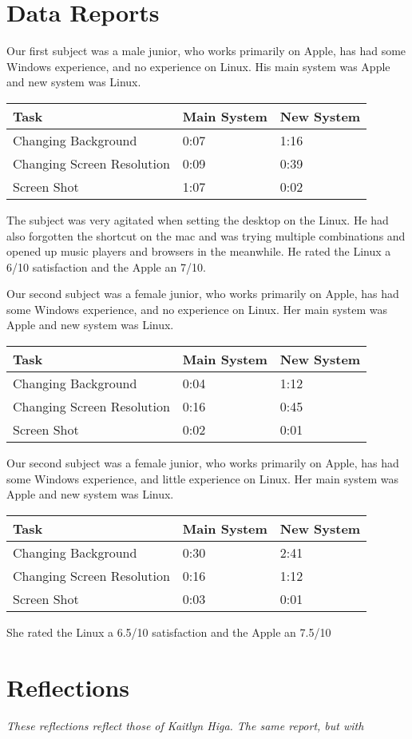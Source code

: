 \documentclass[12pt, onesided, letterpaper]{report}
\begin{document}
\section*{Data Reports}
Our first subject was a male junior, who works primarily on Apple, has had some Windows experience, and no experience on Linux. His main system was Apple and new system was Linux.
\begin{center}
    \begin{tabular}{ | l | l | l |}
    \hline
    Task &Main System & New System  \\ \hline
    Changing Background & 0:07 & 1:16  \\ \hline
    Changing Screen Resolution & 0:09 & 0:39  \\ \hline
    Screen Shot & 1:07 & 0:02 \\
    \hline
    \end{tabular}
\end{center}
The subject was very agitated when setting the desktop on the Linux.  He had also forgotten the shortcut on the mac and was trying multiple combinations and opened up music players and browsers in the meanwhile. 
He rated the Linux a 6/10 satisfaction and the Apple an 7/10.

Our second subject was a female junior, who works primarily on Apple, has had some Windows experience, and no experience on Linux.  Her main system was Apple and new system was Linux.
\begin{center}
    \begin{tabular}{ | l | l | l |}
    \hline
    Task &Main System & New System  \\ \hline
    Changing Background & 0:04 & 1:12  \\ \hline
    Changing Screen Resolution & 0:16 & 0:45  \\ \hline
    Screen Shot & 0:02 & 0:01 \\
    \hline
    \end{tabular}
\end{center}

Our second subject was a female junior, who works primarily on Apple, has had some Windows experience, and little experience on Linux. Her main system was Apple and new system was Linux.
\begin{center}
    \begin{tabular}{ | l | l | l |}
    \hline
    Task &Main System & New System  \\ \hline
    Changing Background & 0:30 & 2:41  \\ \hline
    Changing Screen Resolution & 0:16 & 1:12  \\ \hline
    Screen Shot & 0:03 & 0:01 \\
    \hline
    \end{tabular}
\end{center}
She rated the Linux a 6.5/10 satisfaction and the Apple an 7.5/10

\section*{Reflections}
\indent \textit{These reflections reflect those of Kaitlyn Higa.  The same report, but with }
\end{document}
